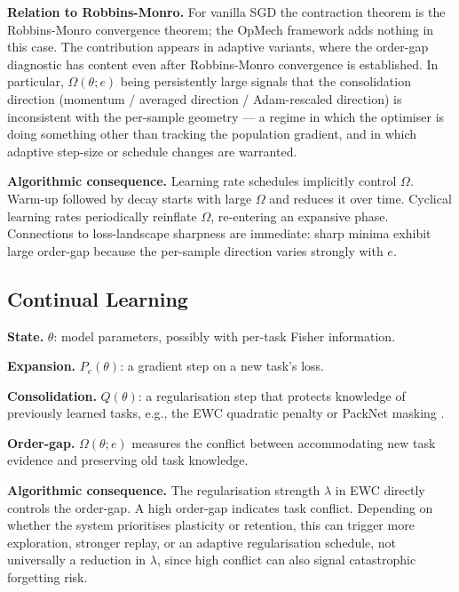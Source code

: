 \documentclass[12pt,a4paper]{article}
\newcommand{\Ogap}{\Omega}
\begin{document}
\textbf{Relation to Robbins-Monro.}
For vanilla SGD the contraction theorem is the Robbins-Monro convergence
theorem; the OpMech framework adds nothing in this case. The contribution
appears in adaptive variants, where the order-gap diagnostic has content
even after Robbins-Monro convergence is established. In particular,
$\Ogap(\theta; e)$ being persistently large signals that the consolidation
direction (momentum / averaged direction / Adam-rescaled direction) is
inconsistent with the per-sample geometry — a regime in which the
optimiser is doing something other than tracking the population gradient,
and in which adaptive step-size or schedule changes are warranted.

\textbf{Algorithmic consequence.}
Learning rate schedules implicitly control $\Ogap$. Warm-up followed by
decay starts with large $\Ogap$ and reduces it over time. Cyclical learning
rates \citep{smith2017cyclical} periodically reinflate $\Ogap$, re-entering
an expansive phase. Connections to loss-landscape sharpness
\citep{foret2021sharpness} are immediate: sharp minima exhibit large
order-gap because the per-sample direction varies strongly with $e$.

\subsection{Continual Learning}
\label{sec:cl}

\textbf{State.}
$\theta$: model parameters, possibly with per-task Fisher information.

\textbf{Expansion.}
$P_e(\theta)$: a gradient step on a new task's loss.

\textbf{Consolidation.}
$Q(\theta)$: a regularisation step that protects knowledge of previously
learned tasks, e.g., the EWC quadratic penalty \citep{kirkpatrick2017ewc} or
PackNet masking \citep{mallya2018packnet}.

\textbf{Order-gap.}
$\Ogap(\theta; e)$ measures the conflict between accommodating new task
evidence and preserving old task knowledge.

\textbf{Algorithmic consequence.}
The regularisation strength $\lambda$ in EWC directly controls the order-gap.
A high order-gap indicates task conflict. Depending on whether the system
prioritises plasticity or retention, this can trigger more exploration,
stronger replay, or an adaptive regularisation schedule, not universally a
reduction in $\lambda$, since high conflict can also signal catastrophic
forgetting risk.
\end{document}
